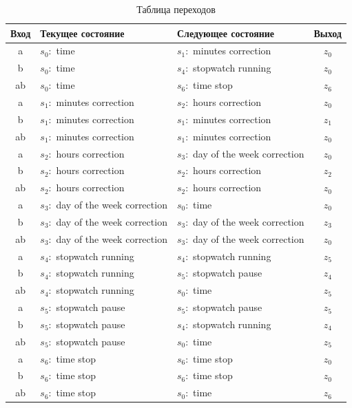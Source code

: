 \documentclass[a4paper, final]{article}
\begin{document}
\newpage
\begin{table}[H]
  \centering
  \caption{Таблица переходов}
  \label{tbl:perehod}
  \footnotesize
  \begin{tabularx}{0.85\textwidth}{|c|X||X|c|}
  \hline
  \textbf{Вход} & \textbf{Текущее состояние} & \textbf{Следующее состояние} & \textbf{Выход} \\
  \hline
  \hline
  a  & $s_0:$ time & $s_1:$ minutes correction & $z_0$ \\
  b  & $s_0:$ time & $s_4:$ stopwatch running & $z_0$ \\
  ab & $s_0:$ time & $s_6:$ time stop & $z_6$ \\
  \hline

  a  & $s_1:$ minutes correction & $s_2:$ hours correction & $z_0$ \\
  b  & $s_1:$ minutes correction & $s_1:$ minutes correction & $z_1$ \\
  ab & $s_1:$ minutes correction & $s_1:$ minutes correction & $z_0$ \\
  \hline

  a  & $s_2:$ hours correction & $s_3:$ day of the week correction& $z_0$ \\
  b  & $s_2:$ hours correction & $s_2:$ hours correction & $z_2$ \\
  ab & $s_2:$ hours correction & $s_2:$ hours correction & $z_0$ \\
  \hline

  a  & $s_3:$ day of the week correction & $s_0:$ time & $z_0$ \\
  b  & $s_3:$ day of the week correction & $s_3:$ day of the week correction & $z_3$ \\
  ab & $s_3:$ day of the week correction & $s_3:$ day of the week correction & $z_0$ \\
  \hline

  a  & $s_4:$ stopwatch running & $s_4:$ stopwatch running & $z_5$ \\
  b  & $s_4:$ stopwatch running & $s_5:$ stopwatch pause & $z_4$ \\
  ab & $s_4:$ stopwatch running & $s_0:$ time & $z_5$ \\
  \hline

  a  & $s_5:$ stopwatch pause & $s_5:$ stopwatch pause & $z_5$ \\
  b  & $s_5:$ stopwatch pause & $s_4:$ stopwatch running & $z_4$ \\
  ab & $s_5:$ stopwatch pause & $s_0:$ time & $z_5$ \\
  \hline

  a  & $s_6:$ time stop & $s_6:$ time stop & $z_0$ \\
  b  & $s_6:$ time stop & $s_6:$ time stop & $z_0$ \\
  ab & $s_6:$ time stop & $s_0:$ time & $z_6$ \\
  \hline
  \end{tabularx}
\end{table}
\end{document}
